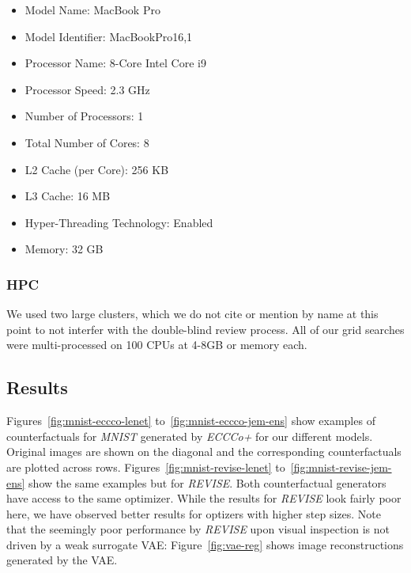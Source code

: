 \begin{itemize}
  \item Model Name: MacBook Pro
  \item Model Identifier: MacBookPro16,1
  \item Processor Name: 8-Core Intel Core i9
  \item Processor Speed: 2.3 GHz
  \item Number of Processors: 1
  \item Total Number of Cores: 8
  \item L2 Cache (per Core): 256 KB
  \item L3 Cache: 16 MB
  \item Hyper-Threading Technology: Enabled
  \item Memory: 32 GB
\end{itemize}

\subsubsection{HPC}

We used two large clusters, which we do not cite or mention by name at this point to not interfer with the double-blind review process. All of our grid searches were multi-processed on 100 CPUs at 4-8GB or memory each. 

\subsection{Results}\label{app:results}

Figures~\ref{fig:mnist-eccco-lenet} to~\ref{fig:mnist-eccco-jem-ens} show examples of counterfactuals for \textit{MNIST} generated by \textit{ECCCo+} for our different models. Original images are shown on the diagonal and the corresponding counterfactuals are plotted across rows. Figures~\ref{fig:mnist-revise-lenet} to~\ref{fig:mnist-revise-jem-ens} show the same examples but for \textit{REVISE}. Both counterfactual generators have access to the same optimizer. While the results for \textit{REVISE} look fairly poor here, we have observed better results for optizers with higher step sizes. Note that the seemingly poor performance by \textit{REVISE} upon visual inspection is not driven by a weak surrogate VAE: Figure~\ref{fig:vae-reg} shows image reconstructions generated by the VAE.



